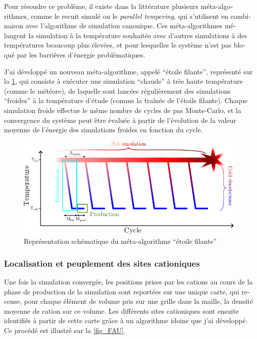 \documentclass[thesis]{subfiles}
\begin{document}
\begin{otherlanguage}{french}
Pour résoudre ce problème, il existe dans la littérature plusieurs méta-algorithmes, comme le recuit simulé ou le \textit{parallel tempering}, qui s'utilisent en combinaison avec l'algorithme de simulation canonique. Ces méta-algorithmes mélangent la simulation à la température souhaitée avec d'autres simulations à des températures beaucoup plus élevées, et pour lesquelles le système n'est pas bloqué par les barrières d'énergie problématiques.

J'ai développé un nouveau méta-algorithme, appelé ``étoile filante'', représenté sur la \cref{fig_shootingstar}, qui consiste à exécuter une simulation ``chaude'' à très haute température (comme le météore), de laquelle sont lancées régulièrement des simulations ``froides'' à la température d'étude (comme la traînée de l'étoile filante). Chaque simulation froide effectue le même nombre de cycles de pas Monte-Carlo, et la convergence du système peut être évaluée à partir de l'évolution de la valeur moyenne de l'énergie des simulations froides en fonction du cycle.\\

\begin{figure}
	\centering
	\includegraphics[width=\linewidth]{figures/cations/shootingstar.pdf}
	\caption{Représentation schématique du méta-algorithme ``étoile filante''}\label{fig_shootingstar}
\end{figure}

\subsubsection{Localisation et peuplement des sites cationiques}

Une fois la simulation convergée, les positions prises par les cations au cours de la phase de production de la simulation sont reportées sur une unique carte, qui recense, pour chaque élément de volume pris sur une grille dans la maille, la densité moyenne de cation sur ce volume. Les différents sites cationiques sont ensuite identifiés à partir de cette carte grâce à un algorithme idoine que j'ai développé. Ce procédé est illustré sur la \cref{fig_FAU}.


\end{otherlanguage}
\end{document}
